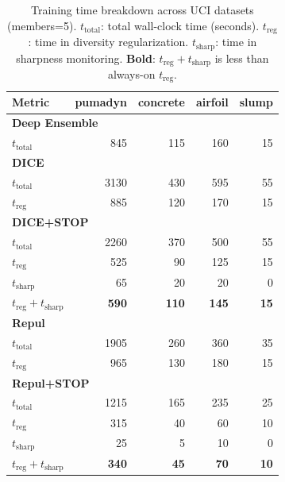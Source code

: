 \documentclass[sigconf]{acmart}
\begin{document}
\begin{table}[!ht]
\centering
\caption{Training time breakdown across UCI datasets (members=5).
$t_{\text{total}}$: total wall-clock time (seconds).
$t_{\text{reg}}$: time in diversity regularization.
$t_{\text{sharp}}$: time in sharpness monitoring.
\textbf{Bold}: $t_{\text{reg}}+t_{\text{sharp}}$ is less than always-on $t_{\text{reg}}$.}
\label{tab:timing}
\setlength{\tabcolsep}{4pt}
\begin{tabular}{lrrrr}
\toprule
\textbf{Metric} & \textbf{pumadyn} & \textbf{concrete} & \textbf{airfoil} & \textbf{slump} \\
\midrule

\multicolumn{5}{l}{\textbf{Deep Ensemble}} \\
$t_{\text{total}}$ & 845 & 115 & 160 & 15 \\

\midrule
\multicolumn{5}{l}{\textbf{DICE}} \\
$t_{\text{total}}$ & 3130 & 430 & 595 & 55 \\
$t_{\text{reg}}$   & 885  & 120 & 170 & 15 \\

\midrule
\multicolumn{5}{l}{\textbf{DICE+STOP}} \\
$t_{\text{total}}$ & 2260 & 370 & 500 & 55 \\
$t_{\text{reg}}$   & 525  & 90  & 125 & 15 \\
$t_{\text{sharp}}$ & 65   & 20  & 20  & 0 \\
$t_{\text{reg}}+t_{\text{sharp}}$ & \textbf{590} & \textbf{110} & \textbf{145} & \textbf{15} \\

\midrule
\multicolumn{5}{l}{\textbf{Repul}} \\
$t_{\text{total}}$ & 1905 & 260 & 360 & 35 \\
$t_{\text{reg}}$   & 965  & 130 & 180 & 15 \\

\midrule
\multicolumn{5}{l}{\textbf{Repul+STOP}} \\
$t_{\text{total}}$ & 1215 & 165 & 235 & 25 \\
$t_{\text{reg}}$   & 315  & 40  & 60  & 10 \\
$t_{\text{sharp}}$ & 25   & 5   & 10  & 0 \\
$t_{\text{reg}}+t_{\text{sharp}}$ & \textbf{340} & \textbf{45} & \textbf{70} & \textbf{10} \\

\bottomrule
\end{tabular}
\end{table}
\end{document}
